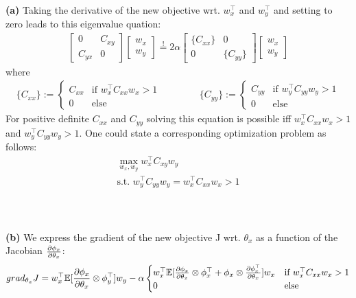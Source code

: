 \documentclass[a4paper]{article}
\newcommand{\eqq}{  \overset{\text{!}}{=} }
\newcommand{\wx}{{w_{x}}}
\newcommand{\wy}{{w_{y}}}
\newcommand{\wxt}{w_{x}^\top}
\newcommand{\wyt}{w_{y}^\top}
\newcommand{\Cxx}{C_{xx}}
\newcommand{\Cxy}{C_{xy}}
\newcommand{\Cyx}{C_{yx}}
\newcommand{\Cyy}{C_{yy}}
\newcommand{\1}{\mathds{1}}
\begin{document}
\textbf{(a)} Taking the derivative of the new objective wrt. $\wxt$ and $\wyt$ and setting to 
zero leads to this eigenvalue quation: 
\begin{align*}
	\begin{bmatrix}
	0 & \Cxy \\
	\Cyx & 0 
	\end{bmatrix}
	\begin{bmatrix}
	 \wx  \\
	 \wy
	\end{bmatrix}
\eqq	 
	2\alpha		
	\begin{bmatrix}
	\{\Cxx\} & 0 \\
	0 & \{\Cyy\}   
	\end{bmatrix}
	\begin{bmatrix}
	 \wx  \\
	 \wy
	\end{bmatrix}	
\end{align*}
where
\begin{align*} 
	\{\Cxx\} := \begin{cases} \Cxx &\text{if } \wxt\Cxx\wx > 1\\ 0 &\text{else} \end{cases}
	\quad\quad\quad\quad
	\{\Cyy\} := \begin{cases} \Cyy &\text{if } \wyt\Cyy\wy > 1\\ 0 &\text{else} \end{cases}
\end{align*}
For positive definite $\Cxx$ and $\Cyy$ solving this equation is possible
iff $\wxt\Cxx\wx > 1$ and $\wyt\Cyy\wy > 1$. 
One could state a corresponding optimization problem as follows: 
\begin{gather*}
	\max_{\wx,\wy} \wxt\Cxy\wy \\ 
	\text{s.t. } \wyt\Cyy\wy = \wxt C_{xx} \wx > 1 
\end{gather*}
\\
\\
\\
\textbf{(b)}
We express the gradient of the new objective J wrt. $\theta_x$
as a function of the Jacobian ${\partial\phi_x\over\partial\theta_x}$:\\
\begin{gather*}
grad_{\theta_x}J 
= 
\wxt\mathbb{E}[{ {\partial\phi_x\over\partial\theta_x}\otimes \phi^\top_y }]\wy
- \alpha 
	\begin{cases} \wxt
	\mathbb{E}[{ {\partial\phi_x\over\partial\theta_x} \otimes \phi^\top_x} + { \phi_x \otimes{\partial\phi_x^\top\over\partial\theta_x} } ]
	\wx &\text{if } \wxt\Cxx\wx > 1\\ 0 &\text{else} \end{cases}
\end{gather*}
\end{document}
